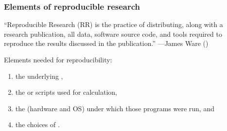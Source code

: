 \begin{frame}
    \frametitle{Elements of reproducible research}
	``Reproducible Research (RR) is the practice of distributing, along with a research publication, all data, software source code, and tools required to reproduce the results discussed in the publication.'' ---James Ware (\citeyear{Ware:2010aa})
	
	\bigskip

Elements needed for reproducibility:
	\begin{enumerate}
		\item the underlying ,
		\item the  or scripts used for calculation,
		\item the  (hardware and OS) under which those programs were run, and
		\item the choices of .
	\end{enumerate}
\end{frame}

